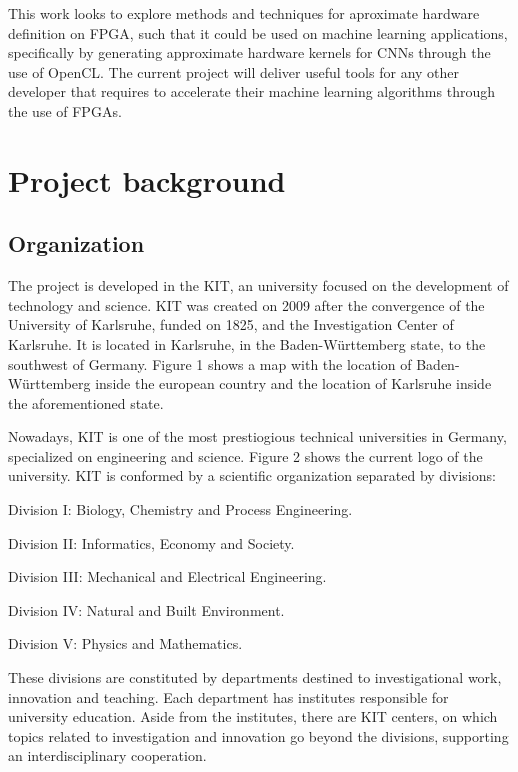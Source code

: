 This work looks to explore methods and techniques for aproximate hardware definition on FPGA, such that
it could be used on machine learning applications, specifically by generating approximate hardware
kernels for CNNs through the use of OpenCL. The current project will deliver useful tools for any 
other developer that requires to accelerate their machine learning algorithms through the use of FPGAs.

\section{Project background}

\subsection{Organization}

The project is developed in the KIT, an university focused on the development of technology and science.
KIT was created on 2009 after the convergence of the University of Karlsruhe, funded on 1825, and the 
Investigation Center of Karlsruhe. It is located in Karlsruhe, in the Baden-Württemberg state, to the
southwest of Germany. Figure 1 shows a map with the location of Baden-Württemberg inside the european
country and the location of Karlsruhe inside the aforementioned state.

Nowadays, KIT is one of the most prestiogious technical universities in Germany, specialized on engineering
and science. Figure 2 shows the current logo of the university. KIT is conformed by a scientific organization
separated by divisions:

\begin{compactitem}
    \item Division I: Biology, Chemistry and Process Engineering.
    \item Division II: Informatics, Economy and Society.
    \item Division III: Mechanical and Electrical Engineering.
    \item Division IV: Natural and Built Environment.
    \item Division V: Physics and Mathematics.
\end{compactitem}

These divisions are constituted by departments destined to investigational work, innovation and teaching.
Each department has institutes responsible for university education. Aside from the institutes, there are
KIT centers, on which topics related to investigation and innovation go beyond the divisions, supporting
an interdisciplinary cooperation. 


